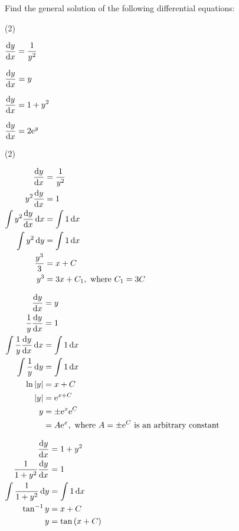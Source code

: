 \documentclass[11pt,a4paper]{book}
\begin{document}
\begin{example}

Find the general solution of the following differential equations:

\begin{tasks}[label=(\alph*),label-width=3.5ex](2)

\task  ${\displaystyle \frac{{\rm d}y}{{\rm d}x}=\frac{1}{y^{2}}}$

\task  ${\displaystyle \frac{{\rm d}y}{{\rm d}x}=y}$

\task  ${\displaystyle \frac{{\rm d}y}{{\rm d}x}=1+y^{2}}$

\task  ${\displaystyle \frac{{\rm d}y}{{\rm d}x}=2{\rm e}^{y}}$

\end{tasks}

\Solution

\begin{tasks}[label=(\alph*),label-width=3.5ex](2)

\task
$
\begin{aligned}[t]
\frac{{\rm d}y}{{\rm d}x} & =\frac{1}{y^{2}}\\
y^{2}\frac{{\rm d}y}{{\rm d}x} & =1\\
\int y^{2}\frac{{\rm d}y}{{\rm d}x}\,{\rm d}x & =\int1\,{\rm d}x\\
\int y^{2}\,{\rm d}y & =\int1\,{\rm d}x\\
\frac{y^{3}}{3} & =x+C\\
y^{3} & =3x+C_{1},\text{ where \ensuremath{C_{1}=3C}}
\end{aligned}
$

\task
$
\begin{aligned}[t]
\frac{{\rm d}y}{{\rm d}x} & =y\\
\frac{1}{y}\frac{{\rm d}y}{{\rm d}x} & =1\\
\int\frac{1}{y}\frac{{\rm d}y}{{\rm d}x}\,{\rm d}x & =\int1\,{\rm d}x\\
\int\frac{1}{y}\,{\rm d}y & =\int1\,{\rm d}x\\
\ln\left|y\right| & =x+C\\
\left|y\right| & ={\rm e}^{x+C}\\
y & =\pm{\rm e}^{x}{\rm e}^{C}\\
 & =A{\rm e}^{x},\text{ where \ensuremath{A=\pm{\rm e}^{C}} is an arbitrary constant}
\end{aligned}
$

\task
$
\begin{aligned}[t]
\frac{{\rm d}y}{{\rm d}x} & =1+y^{2}\\
\frac{1}{1+y^{2}}\frac{{\rm d}y}{{\rm d}x} & =1\\
\int\frac{1}{1+y^{2}}\,{\rm d}y & =\int1\,{\rm d}x\\
\tan^{-1}y & =x+C\\
y & =\tan\left(x+C\right)
\end{aligned}
$


\end{tasks}
\end{example}
\end{document}

